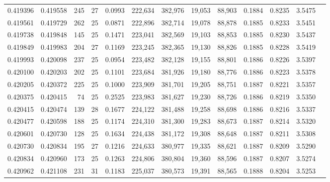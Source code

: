 \begin{tabular}{rrrrrrrrrrrrr}
0.419396 & 0.419558 & 245 &  27 &                                     0.0993 & 222,634 & 382,976 &  19,053 &  88,903 & 0.1884 & 0.8235 & 3.5475 \\
0.419561 & 0.419729 & 262 &  25 &                                     0.0871 & 222,896 & 382,714 &  19,078 &  88,878 & 0.1885 & 0.8233 & 3.5451 \\
0.419738 & 0.419848 & 145 &  25 &                                     0.1471 & 223,041 & 382,569 &  19,103 &  88,853 & 0.1885 & 0.8230 & 3.5437 \\
0.419849 & 0.419983 & 204 &  27 &                                     0.1169 & 223,245 & 382,365 &  19,130 &  88,826 & 0.1885 & 0.8228 & 3.5419 \\
0.419993 & 0.420098 & 237 &  25 &                                     0.0954 & 223,482 & 382,128 &  19,155 &  88,801 & 0.1886 & 0.8226 & 3.5397 \\
0.420100 & 0.420203 & 202 &  25 &                                     0.1101 & 223,684 & 381,926 &  19,180 &  88,776 & 0.1886 & 0.8223 & 3.5378 \\
0.420205 & 0.420372 & 225 &  25 &                                     0.1000 & 223,909 & 381,701 &  19,205 &  88,751 & 0.1887 & 0.8221 & 3.5357 \\
0.420375 & 0.420415 &  74 &  25 &                                     0.2525 & 223,983 & 381,627 &  19,230 &  88,726 & 0.1886 & 0.8219 & 3.5350 \\
0.420415 & 0.420474 & 139 &  28 &                                     0.1677 & 224,122 & 381,488 &  19,258 &  88,698 & 0.1886 & 0.8216 & 3.5337 \\
0.420477 & 0.420598 & 188 &  25 &                                     0.1174 & 224,310 & 381,300 &  19,283 &  88,673 & 0.1887 & 0.8214 & 3.5320 \\
0.420601 & 0.420730 & 128 &  25 &                                     0.1634 & 224,438 & 381,172 &  19,308 &  88,648 & 0.1887 & 0.8211 & 3.5308 \\
0.420730 & 0.420834 & 195 &  27 &                                     0.1216 & 224,633 & 380,977 &  19,335 &  88,621 & 0.1887 & 0.8209 & 3.5290 \\
0.420834 & 0.420960 & 173 &  25 &                                     0.1263 & 224,806 & 380,804 &  19,360 &  88,596 & 0.1887 & 0.8207 & 3.5274 \\
0.420962 & 0.421108 & 231 &  31 &                                     0.1183 & 225,037 & 380,573 &  19,391 &  88,565 & 0.1888 & 0.8204 & 3.5253 \\

\end{tabular}
